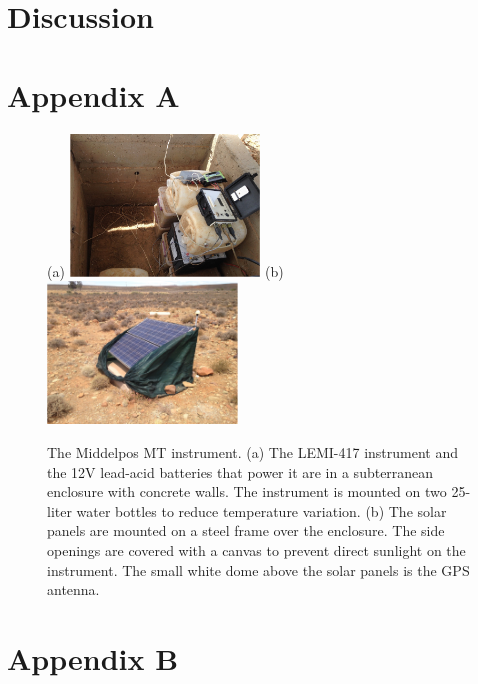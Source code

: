 \documentclass[draft,linenumbers]{agujournal2018}
\begin{document}
\clearpage

\section{Discussion}

\section{Appendix A}

\begin{figure}[h]
  \centering
  (a)
  \includegraphics[width=0.45\textwidth]{figures/instrument.pdf}
  (b)
  \includegraphics[width=0.45\textwidth]{figures/solarpanel.pdf}
  \caption{The Middelpos MT instrument. (a) The LEMI-417 instrument and the 12V lead-acid batteries that power it are in a subterranean enclosure with concrete walls. The instrument is mounted on two 25-liter water bottles to reduce temperature variation. (b) The solar panels are mounted on a steel frame over the enclosure. The side openings are covered with a canvas to prevent direct sunlight on the instrument. The small white dome above the solar panels is the GPS antenna.}
  \label{fig:lemi}
\end{figure}


\clearpage
\section{Appendix B}
\label{appendix:tables}
\end{document}
